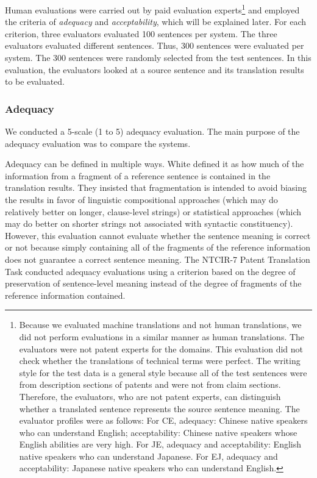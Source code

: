 \documentclass[english]{jnlp_1.4}
\begin{document}
Human evaluations were carried out by paid evaluation experts\footnote{
Because we evaluated machine translations and not human translations, we did not perform evaluations in a similar manner as human translations. 
The evaluators were not patent experts for the domains. 
This evaluation did not check whether the translations of technical terms were perfect. 
The writing style for the test data is a general style because all of the test sentences were from description sections of patents and were not from claim sections. 
Therefore, the evaluators, who are not patent experts, can distinguish whether a translated sentence represents the source sentence meaning. 
The evaluator profiles were as follows: 
For CE, adequacy: Chinese native speakers who can understand English; 
acceptability: Chinese native speakers whose English abilities are very high.
For JE, adequacy and acceptability: English native speakers who can understand Japanese.
For EJ, adequacy and acceptability: Japanese native speakers who can understand English.
} and employed the criteria of \textit{adequacy} and \textit{acceptability}, which will be explained later.
For each criterion, three evaluators evaluated 100 sentences per system. 
The three evaluators evaluated different sentences. 
Thus, 300 sentences were evaluated per system.
The 300 sentences were randomly selected from the test sentences.
In this evaluation, the evaluators looked at a source sentence and its translation results to be evaluated.


\subsubsection{Adequacy}

We conducted a 5-scale (1 to 5) adequacy evaluation. 
The main purpose of the adequacy evaluation was to compare the systems. 

Adequacy can be defined in multiple ways.
White \cite{White-EtAl:AMTA1994} defined it as how much of the information from a fragment of a reference sentence is contained in the translation results. 
They insisted that fragmentation is intended to avoid biasing the results in favor of linguistic compositional approaches (which may do relatively better on longer, clause-level strings) or statistical approaches (which may do better on shorter strings not associated with syntactic constituency).
However, this evaluation cannot evaluate whether the sentence meaning is correct or not because simply containing all of the fragments of the reference information does not guarantee a correct sentence meaning. 
The NTCIR-7 Patent Translation Task \cite{Fujii-EtAl:NTCIR7} conducted adequacy evaluations using a criterion based on the degree of preservation of sentence-level meaning instead of the degree of fragments of the reference information contained. 
\end{document}
